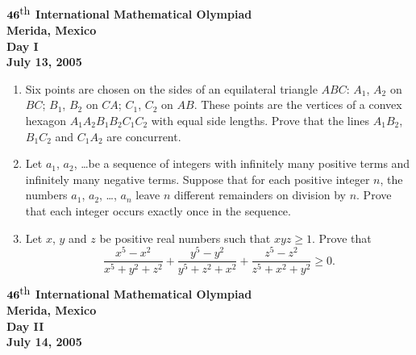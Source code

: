 \documentclass[12pt]{article}
\def\th{^{\scriptstyle\mbox{th}}}
\begin{document}
\begin{center}
${\bf 46\th}$ {\bf International Mathematical Olympiad} \\[.1in]
{\bf Merida, Mexico} \\ [.05in]
{\bf Day I}\\[.05in]
{\bf July 13, 2005}
\end{center}

\vspace*{.3in}

\begin{enumerate}
\item
Six points are chosen on the sides of an equilateral triangle $ABC$:
$A_1$, $A_2$ on $BC$; $B_1$, $B_2$ on $CA$; $C_1$, $C_2$ on $AB$.
These points are the vertices of a convex hexagon $A_1 A_2 B_1 B_2 C_1 C_2$
with equal side lengths. Prove that the lines $A_1 B_2$, $B_1 C_2$ and 
$C_1 A_2$ are concurrent.

\item
Let $a_1$, $a_2$, \dots be a sequence of integers with infinitely many 
positive terms and infinitely many negative terms. Suppose that for each 
positive integer $n$, the numbers $a_1$, $a_2$, \dots, $a_n$ leave $n$ 
different remainders on division by $n$. Prove that each integer occurs 
exactly once in the sequence.

\item
Let $x$, $y$ and $z$ be positive real numbers such that $xyz\ge 1$.
Prove that
\[
\frac{x^5 - x^2}{x^5+y^2+z^2} + 
\frac{y^5 - y^2}{y^5+z^2+x^2} + 
\frac{z^5 - z^2}{z^5+x^2+y^2} \ge 0.
\]
\end{enumerate}

\pagebreak %
\begin{center}
${\bf 46\th}$ {\bf International Mathematical Olympiad} \\[.1in]
{\bf Merida, Mexico} \\ [.05in]
{\bf Day II}\\[.05in]
{\bf July 14, 2005}
\end{center}

\vspace*{.3in}
\end{document}

